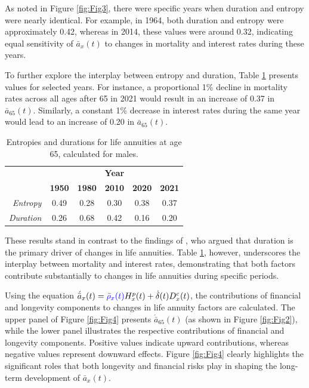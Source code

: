 \documentclass[12pt]{article}
\newcommand{\revision}[1]{\textcolor{blue}{#1}}
\begin{document}
As noted in Figure \ref{fig:Fig3}, there were specific years when duration and entropy were nearly identical. For example, in 1964, both duration and entropy were approximately 0.42, whereas in 2014, these values were around 0.32, indicating equal sensitivity of \( \bar{a}_x(t) \) to changes in mortality and interest rates during these years.

To further explore the interplay between entropy and duration, Table \ref{tab:entropyDuration} presents values for selected years. For instance, a proportional 1\% decline in mortality rates across all ages after 65 in 2021 would result in an increase of 0.37 in \( \bar{a}_{65}(t) \). Similarly, a constant 1\% decrease in interest rates during the same year would lead to an increase of 0.20 in \( \bar{a}_{65}(t) \).



\begin{table}[ht]
	\begin{tabular}{rccccc}
		\toprule
		& \multicolumn{5}{c}{\textbf{Year}}  \\

		& \textbf{1950} & \textbf{1980} & \textbf{2010 }& \textbf{2020} & \textbf{2021} \\
\hline
	\textit{Entropy} &  0.49    & 0.28     & 0.30     &   0.38 & 0.37  \\
	
		\textit{Duration} &  0.26    & 0.68     &  0.42    &     0.16 & 0.20\\
\bottomrule
	\end{tabular}
	 \caption{Entropies and durations for life annuities at age 65, calculated for males.}
	\label{tab:entropyDuration}   
\end{table}

These results stand in contrast to the findings of \citet{rabitti2020mortality}, who argued that duration is the primary driver of changes in life annuities. Table \ref{tab:entropyDuration}, however, underscores the interplay between mortality and interest rates, demonstrating that both factors contribute substantially to changes in life annuities during specific periods.

Using the equation \( \acute{\bar{a}}_x(t) = \revision{\bar{\rho}_x(t)} {H}^{p}_x(t) + \dot{\delta}(t) D^{c}_x(t) \), the contributions of financial and longevity components to changes in life annuity factors are calculated. The upper panel of Figure \ref{fig:Fig4} presents \( \acute{\bar{a}}_{65}(t) \) (as shown in Figure \ref{fig:Fig2}), while the lower panel illustrates the respective contributions of financial and longevity components. Positive values indicate upward contributions, whereas negative values represent downward effects. Figure \ref{fig:Fig4} clearly highlights the significant roles that both longevity and financial risks play in shaping the long-term development of \( \bar{a}_x(t) \).
\end{document}
